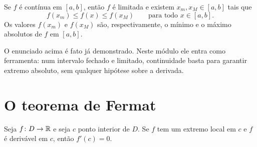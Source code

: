 \documentclass[11pt,a4paper]{article}
\begin{document}
\begin{teorema}\label{teo:weierstrass}
Se $f$ é contínua em $[a,b]$, então $f$ é limitada e existem $x_m,x_M\in[a,b]$ tais que
\[
f(x_m)\le f(x)\le f(x_M)\qquad\text{para todo }x\in[a,b].
\]
Os valores $f(x_m)$ e $f(x_M)$ são, respectivamente, o mínimo e o máximo absolutos de $f$ em $[a,b]$.
\end{teorema}

O enunciado acima é fato já demonstrado. Neste módulo ele entra como ferramenta: num intervalo fechado e limitado, continuidade basta para garantir extremo absoluto, sem qualquer hipótese sobre a derivada.

\section{O teorema de Fermat}

\begin{teorema}\label{teo:fermat}
Seja $f\colon D\to\mathbb{R}$ e seja $c$ ponto interior de $D$. Se $f$ tem um extremo local em $c$ e $f$ é derivável em $c$, então $f'(c)=0$.
\end{teorema}
\end{document}
